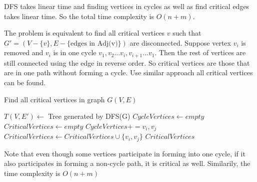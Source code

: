 \documentclass[12pt,a4paper]{article}
\newcommand{\question}[1]{\bigskip\noindent{\textbf{Q{#1} solution}}}
\begin{document}
DFS takes linear time and finding vertices in cycles as well as find critical edges takes linear time. So the total time complexity is $O(n + m)$.

\question{22.C}

The problem is equivalent to find all critical vertices $v$ such that $G' = (V - \{v\}, E - \mbox{\{edges in Adj(v)\}})$ are disconnected. Suppose vertex $v_i$ is removed and $v_i$ is in one cycle $v_1,v_2...v_i,v_{i+1}...v_1$. Then the rest of vertices are still connected using the edge in reverse order. So critical vertices are those that are in one path without forming a cycle. Use similar approach all critical vertices can be found.

\begin{algorithm}
\caption{Find all critical vertices in graph $G(V,E)$}\label{alg:q22C}
\begin{algorithmic}
    \State $T(V,E') \gets$ Tree generated by DFS(G)
    \State $CycleVertices \gets empty$
    \State $CriticalVertices \gets empty$
      \State $CycleVertices += v_i,v_j$
    \EndFor
        \State $CriticalVertices \gets CriticalVertices \cup \{v_i,v_j\}$
      \EndFor
    \EndFor
    \State \Return $CriticalVertices$
  \EndFunction
\end{algorithmic}
\end{algorithm}

Note that even though some vertices participate in forming into one cycle, if it also participates in forming a non-cycle path, it is critical as well. Similarily, the time complexity is $O(n + m)$
\end{document}
